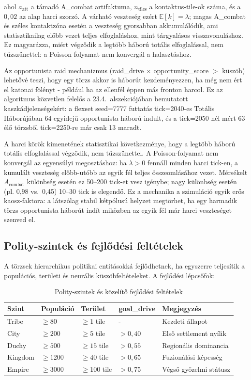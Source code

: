 ahol $a_{\text{att}}$ a támadó A\_combat artifaktuma, $n_{\text{tiles}}$ a
kontaktus-tile-ok száma, és a $0{,}02$ az alap harci szorzó.
A várható veszteség ezért $\mathbb{E}[k] = \lambda$; magas A\_combat és széles
kontaktzóna esetén a veszteség gyorsabban akkumulálódik, ami statisztikailag
előbb vezet teljes elfoglaláshoz, mint tárgyalásos visszavonuláshoz.
Ez magyarázza, miért végződik a legtöbb háború totális elfoglalással, nem
tűzszünettel: a Poisson-folyamat nem konvergál a halasztáshoz.

Az opportunista raid mechanizmus (raid\_drive $\times$ opportunity\_score $>$ küszöb) lehetővé teszi, hogy egy törzs akkor is háborút kezdeményezzen, ha még nem ért el katonai fölényt - például ha az ellenfél éppen más fronton harcol. Ez az algoritmus közvetlen felelős a 23.4.~alszekciójában bemutatott kaszkádjelenségekért: a flexset seed=7777 futtatás tick=2040-es Totális Háborújában 64 egyidejű opportunista háború indult, és a tick=2050-nél mért 63 élő törzsből tick=2250-re már csak 13 maradt.

A harci körök kimenetének statisztikai következménye, hogy a legtöbb háború
totális elfoglalással végződik, nem tűzszünettel. A Poisson-folyamat nem
konvergál az egyensúlyi megosztáshoz: ha $\lambda > 0$ fennáll minden harci
tick-en, a kumulált veszteség előbb-utóbb az egyik fél teljes összeomlásához
vezet. Mérsékelt $A_{\text{combat}}$ különbség esetén ez 50--200 tick-et vesz igénybe;
nagy különbség esetén (pl. 0{,}98 vs.\ 0{,}45) 10--30 tick is elegendő.
Ez a mechanika a szimuláció egyik erős kaosz-faktora: a látszólag stabil
kétpólusú helyzet megtörhet, ha egy harmadik törzs opportunista háborút indít
miközben az egyik fél már harci veszteséget szenved el.

\subsection*{Polity-szintek és fejlődési feltételek}

A törzsek hierarchikus politikai entitásokká fejlődhetnek, ha egyszerre teljesítik a populációs, területi és neurális küszöbfeltételeket. A fejlődési lépcsőfok:

\begin{table}[h]
\centering
\caption{Polity-szintek és közelítő fejlődési feltételek}
\label{tab:polity}
\begin{tabular}{lllll}
\hline
\textbf{Szint} & \textbf{Populáció} & \textbf{Terület} & \textbf{goal\_drive} & \textbf{Megjegyzés} \\
\hline
Tribe   & $\geq 80$    & $\geq 1$ tile    & -              & Kezdeti állapot \\
City    & $\geq 200$   & $\geq 5$ tile    & $> 0{,}40$     & Első settlement nyílik \\
Duchy   & $\geq 500$   & $\geq 15$ tile   & $> 0{,}55$     & Regionális dominancia \\
Kingdom & $\geq 1200$  & $\geq 40$ tile   & $> 0{,}65$     & Fuzionálási képesség \\
Empire  & $\geq 3000$  & $\geq 100$ tile  & $> 0{,}75$     & Végső győzelmi státusz \\
\hline
\end{tabular}
\end{table}

